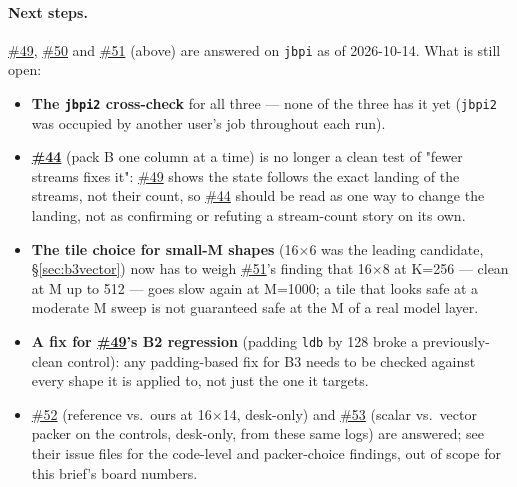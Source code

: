 \documentclass[10pt,a4paper]{article}
\newcommand{\iss}[1]{\href{https://github.com/JieGH/RVV_code_gen_via_MLIR_xDSL/issues/#1}{\##1}}
\begin{document}
\paragraph{Next steps.} \iss{49}, \iss{50} and \iss{51} (above) are answered on \texttt{jbpi} as of 2026-10-14. What is
still open:
\begin{itemize}
  \item \textbf{The \texttt{jbpi2} cross-check} for all three --- none of the three has it yet (\texttt{jbpi2} was
  occupied by another user's job throughout each run).
  \item \textbf{\iss{44}} (pack B one column at a time) is no longer a clean test of "fewer streams fixes it": \iss{49}
  shows the state follows the exact landing of the streams, not their count, so \iss{44} should be read as one way to
  change the landing, not as confirming or refuting a stream-count story on its own.
  \item \textbf{The tile choice for small-M shapes} (16$\times$6 was the leading candidate, \S\ref{sec:b3vector}) now
  has to weigh \iss{51}'s finding that 16$\times$8 at K=256 --- clean at M up to 512 --- goes slow again at M=1000; a
  tile that looks safe at a moderate M sweep is not guaranteed safe at the M of a real model layer.
  \item \textbf{A fix for \iss{49}'s B2 regression} (padding \texttt{ldb} by 128 broke a previously-clean control):
  any padding-based fix for B3 needs to be checked against every shape it is applied to, not just the one it targets.
  \item \iss{52} (reference vs.\ ours at 16$\times$14, desk-only) and \iss{53} (scalar vs.\ vector packer on the
  controls, desk-only, from these same logs) are answered; see their issue files for the code-level and packer-choice
  findings, out of scope for this brief's board numbers.
\end{itemize}
\end{document}
